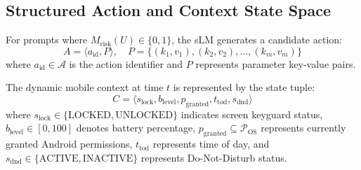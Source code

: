 \subsection{Structured Action and Context State Space}
For prompts where $M_{\text{risk}}(U) \in \{0, 1\}$, the sLM generates a candidate action:
\begin{equation}
A = \langle a_{\text{id}}, P \rangle, \quad P = \{ (k_1, v_1), (k_2, v_2), \dots, (k_m, v_m) \}
\end{equation}
where $a_{\text{id}} \in \mathcal{A}$ is the action identifier and $P$ represents parameter key-value pairs.

The dynamic mobile context at time $t$ is represented by the state tuple:
\begin{equation}
C = \langle s_{\text{lock}}, b_{\text{level}}, p_{\text{granted}}, t_{\text{tod}}, s_{\text{dnd}} \rangle
\end{equation}
where $s_{\text{lock}} \in \{\text{LOCKED}, \text{UNLOCKED}\}$ indicates screen keyguard status, $b_{\text{level}} \in [0, 100]$ denotes battery percentage, $p_{\text{granted}} \subseteq \mathcal{P}_{\text{OS}}$ represents currently granted Android permissions, $t_{\text{tod}}$ represents time of day, and $s_{\text{dnd}} \in \{\text{ACTIVE}, \text{INACTIVE}\}$ represents Do-Not-Disturb status.

